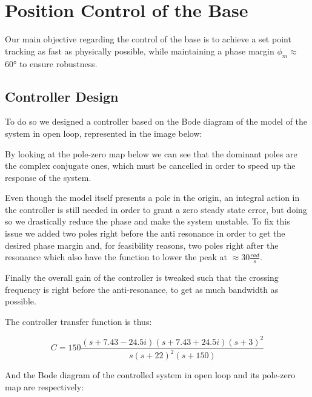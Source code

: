 \chapter{Position Control of the Base}
\label{cha:position_base}

Our main objective regarding the control of the base is to achieve a set point tracking as fast as physically possible, while maintaining a phase margin $\phi_m\approx$ 60° to ensure robustness.

\section{Controller Design}

To do so we designed a controller based on the Bode diagram of the model of the system in open loop, represented in the image below:


By looking at the pole-zero map below we can see that the dominant poles are the complex conjugate ones, which must be cancelled in order to speed up the response of the system.


Even though the model itself presents a pole in the origin, an integral action in the controller is still needed in order to grant a zero steady state error, but doing so we drastically reduce the phase and make the system unstable.
To fix this issue we added two poles right before the anti resonance in order to get the desired phase margin and, for feasibility reasons, two poles right after the resonance which also have the function to lower the peak at $\approx 30 \frac{rad}{s}$.

Finally the overall gain of the controller is tweaked such that the crossing frequency is right before the anti-resonance, to get as much bandwidth as possible.

The controller transfer function is thus:

\begin{equation}
    C = 150 \frac{(s+7.43-24.5i)(s+7.43+24.5i)(s+3)^2}{s(s+22)^2(s+150)}
\end{equation}

And the Bode diagram of the controlled system in open loop and its pole-zero map are respectively:

